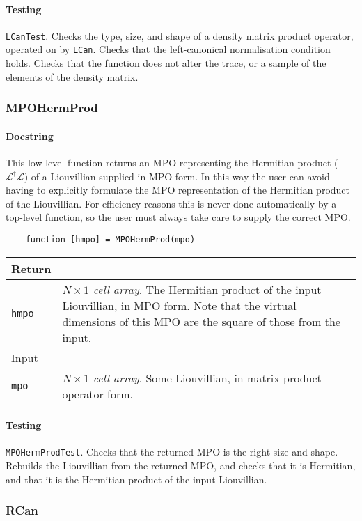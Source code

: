  \paragraph{Testing} \lstinline$LCanTest$. Checks the type, size, and shape of a density matrix product operator, operated on by \lstinline$LCan$. Checks that the left-canonical normalisation condition holds. Checks that the function does not alter the trace, or a sample of the elements of the density matrix. 
 
 \subsubsection{MPOHermProd}
 \paragraph{Docstring} This low-level function returns an MPO representing the Hermitian product (\(\mathcal{L}^{\dagger}\mathcal{L}\)) of a Liouvillian supplied in MPO form. In this way the user can avoid having to explicitly formulate the MPO representation of the Hermitian product of the Liouvillian. For efficiency reasons this is never done automatically by a top-level function, so the user must always take care to supply the correct MPO.
 \begin{lstlisting}
 	function [hmpo] = MPOHermProd(mpo) \end{lstlisting}
 \begin{longtabu}{X[1,1]X[4,1]}
 \hline
 Return & \\ \hline
 \lstinline$hmpo$ & \emph{\(N \times 1\) cell array}. The Hermitian product of the input Liouvillian, in MPO form. Note that the virtual dimensions of this MPO are the square of those from the input. \\ \hline
 Input & \\ \hline
 \lstinline$mpo$ & \emph{\(N \times 1\) cell array}. Some Liouvillian, in matrix product operator form. \\ 
 \hline
 \end{longtabu}
 \paragraph{Testing} \lstinline$MPOHermProdTest$. Checks that the returned MPO is the right size and shape. Rebuilds the Liouvillian from the returned MPO, and checks that it is Hermitian, and that it is the Hermitian product of the input Liouvillian. 
 
 \subsubsection{RCan}
